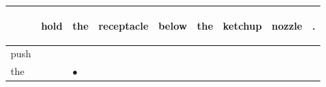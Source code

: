 \documentclass[landscape]{article}
\newcommand{\ssp}{\hspace{2pt}}
\newcommand{\mex}{\cellcolor{g}$\bullet$}
\begin{document}
\noindent\begin{tabular}{|l|p{10pt}|p{10pt}|p{10pt}|p{10pt}|p{10pt}|p{10pt}|p{10pt}|p{10pt}|}
\hline
&\begin{sideways}\cellcolor{ref0}hold\hspace{12pt}\end{sideways}&\begin{sideways}\cellcolor{ref1}the\hspace{12pt}\end{sideways}&\begin{sideways}\cellcolor{ref2}receptacle\hspace{12pt}\end{sideways}&\begin{sideways}\cellcolor{ref3}below\hspace{12pt}\end{sideways}&\begin{sideways}\cellcolor{ref4}the\hspace{12pt}\end{sideways}&\begin{sideways}\cellcolor{ref5}ketchup\hspace{12pt}\end{sideways}&\begin{sideways}\cellcolor{ref6}nozzle\hspace{12pt}\end{sideways}&\begin{sideways}\cellcolor{ref7}.\hspace{12pt}\end{sideways}\\
\hline
\ssp push \ssp&\hspace{2pt}&\hspace{2pt}&\hspace{2pt}&\hspace{2pt}&\hspace{2pt}&\hspace{2pt}&\hspace{2pt}&\hspace{2pt}\\
\hline
\ssp \cellcolor{ref1}the \ssp&\hspace{2pt}&\hspace{2pt}\mex&\hspace{2pt}&\hspace{2pt}&\hspace{2pt}&\hspace{2pt}&\hspace{2pt}&\hspace{2pt}\\

\end{tabular}
\end{document}

